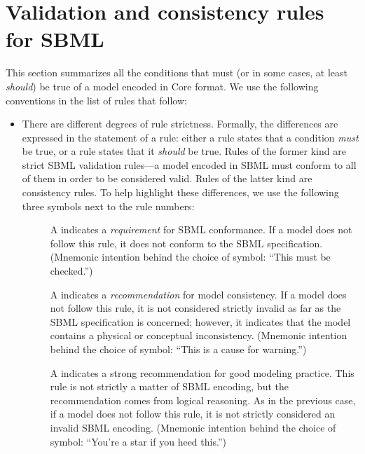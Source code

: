 %
%

\section{Validation and consistency rules for SBML}
\label{apdx:validation-rules}

This section summarizes all the conditions that must (or in some
cases, at least \emph{should}) be true of a model encoded in
\sbmlthree Core format.  We use the following conventions in the
list of rules that follow:
\begin{itemize}

\item There are different degrees of rule strictness.  Formally,
  the differences are expressed in the statement of a rule: either
  a rule states that a condition \emph{must} be true, or a rule
  states that it \emph{should} be true.  Rules of the former kind
  are strict SBML validation rules---a model encoded in SBML must
  conform to all of them in order to be considered valid.  Rules
  of the latter kind are consistency rules.  To help highlight
  these differences, we use the following three symbols next to
  the rule numbers:
  \begin{description}

  \item[\hspace*{7.8pt}\vSymbol] A \vSymbolName indicates a
    \emph{requirement} for SBML conformance. If a model does not
    follow this rule, it does not conform to the SBML
    specification.  (Mnemonic intention behind the choice of
    symbol: ``This must be checked.'')

  \item[\hspace*{8.7pt}\cSymbol] A \cSymbolName indicates a
    \emph{recommendation} for model consistency.  If a model does
    not follow this rule, it is not considered strictly invalid as
    far as the SBML specification is concerned; however, it
    indicates that the model contains a physical or conceptual
    inconsistency.  (Mnemonic intention behind the choice of
    symbol: ``This is a cause for warning.'')

  \item[\hspace*{7.5pt}\mSymbol] A \mSymbolName indicates a strong
    recommendation for good modeling practice.  This rule is not
    strictly a matter of SBML encoding, but the recommendation
    comes from logical reasoning.  As in the previous case, if a
    model does not follow this rule, it is not strictly considered
    an invalid SBML encoding.  (Mnemonic intention behind the
    choice of symbol: ``You're a star if you heed this.'')


\end{description}
\end{itemize}

